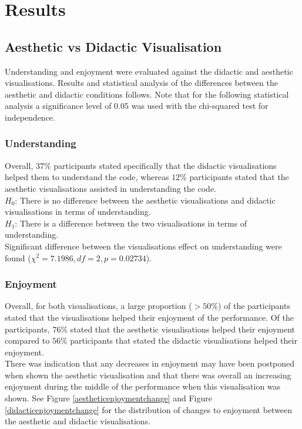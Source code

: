 \documentclass{article}
\begin{document}
\section{Results}

\subsection{Aesthetic vs Didactic Visualisation}

Understanding and enjoyment were evaluated against the didactic and aesthetic visualisations. Results and statistical analysis of the differences between the aesthetic and didactic conditions follows. Note that for the following statistical analysis a significance level of $0.05$ was used with the chi-squared test for independence.

\subsubsection{Understanding}
Overall, $37\%$ participants stated specifically that the didactic visualisations helped them to understand the code, whereas $12\%$ participants stated that the aesthetic visualisations assisted in understanding the code.\\

$H_0$: There is no difference between the aesthetic visualisations and didactic visualisations in terms of understanding.\\
$H_1$: There is a difference between the two visualisations in terms of understanding.\\

Significant difference between the visualisations effect on understanding were found ($\chi^2=7.1986,df=2,p=0.02734$).

\subsubsection{Enjoyment}
Overall, for both visualisations, a large proportion ($> 50\%$) of the participants stated that the visualisations helped their enjoyment of the performance. Of the participants, $76\%$ stated that the aesthetic visualisations helped their enjoyment compared to $56\%$ participants that stated the didactic visualisations helped their enjoyment.\\

There was indication that any decreases in enjoyment may have been postponed when shown the aesthetic visualisation and that there was overall an increasing enjoyment during the middle of the performance when this visualisation was shown. See Figure \ref{aestheticenjoymentchange} and Figure \ref{didacticenjoymentchange} for the distribution of changes to enjoyment between the aesthetic and didactic visualisations.\\
\end{document}

